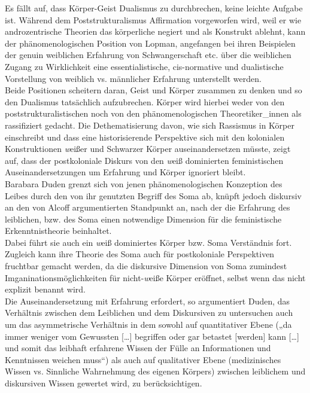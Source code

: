 \noindent Es fällt auf, dass Körper-Geist Dualismus zu durchbrechen, keine leichte
Aufgabe ist. Während dem Poststrukturalismus Affirmation vorgeworfen wird, weil
er wie androzentrische Theorien das körperliche negiert und als Konstrukt
ablehnt, kann der phänomenologischen Position von Lopman, angefangen bei ihren
Beispielen der genuin weiblichen Erfahrung von Schwangerschaft etc. über die
weiblichen Zugang zu Wirklichkeit eine essentialistische, cis-normative und
dualistische Vorstellung von weiblich vs. männlicher Erfahrung unterstellt
werden. \\
Beide Positionen scheitern daran, Geist und Körper zusammen zu denken
und so den Dualismus tatsächlich aufzubrechen. Körper wird hierbei weder von
den poststrukturalistischen noch von den phänomenologischen Theoretiker\_innen
als rassifiziert gedacht. Die Dethematisierung davon, wie sich Rassismus in
Körper einschreibt und dass eine historisierende Perspektive sich mit den
kolonialen Konstruktionen \textit{w}eißer und Schwarzer Körper auseinandersetzen müsste,
zeigt auf, dass der postkoloniale Diskurs von den \textit{w}eiß dominierten
feministischen Auseinandersetzungen um Erfahrung und Körper ignoriert bleibt.\\

Barabara Duden grenzt sich von jenen phänomenologischen Konzeption des Leibes
durch den von ihr genutzten Begriff des Soma ab, knüpft jedoch diskursiv an den
von Alcoff argumentierten Standpunkt an, nach der die Erfahrung des leiblichen,
bzw. des Soma einen notwendige Dimension für die feministische
Erkenntnistheorie beinhaltet.\footnotemark{}\\
Dabei führt sie auch ein \textit{w}eiß dominiertes Körper
bzw. Soma Verständnis fort. Zugleich kann ihre Theorie des Soma auch für
postkoloniale Perspektiven fruchtbar gemacht werden, da die diskursive
Dimension von Soma zumindest Imganinationsmöglichkeiten für nicht-\textit{w}eiße Körper
eröffnet, selbst wenn das nicht explizit benannt wird.\\

\noindent Die Auseinandersetzung mit Erfahrung erfordert, so argumentiert Duden, das
Verhältnis zwischen dem Leiblichen und dem Diskursiven zu untersuchen auch um
das asymmetrische Verhältnis in dem sowohl auf quantitativer Ebene („da immer
weniger vom Gewussten […] begriffen oder gar betastet [werden] kann […] und
somit das leibhaft erfahrene Wissen der Fülle an Informationen und Kenntnissen
weichen muss“\footnotemark) als auch auf qualitativer Ebene (medizinisches Wissen vs.
Sinnliche Wahrnehmung des eigenen Körpers) zwischen leiblichem und diskursiven
Wissen gewertet wird, zu berücksichtigen.\\

